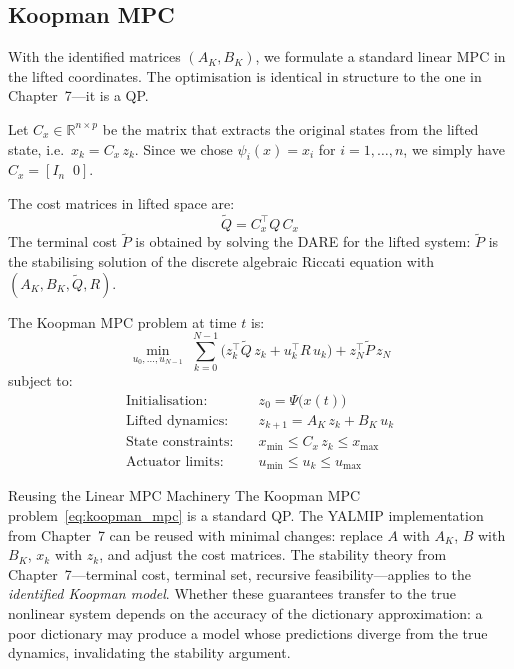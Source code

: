 \subsection{Koopman MPC}
\label{sec:koopman_mpc}

With the identified matrices $(A_K, B_K)$, we formulate a standard linear MPC in the lifted coordinates. The optimisation is identical in structure to the one in Chapter~7---it is a QP.

Let $C_x \in \mathbb{R}^{n \times p}$ be the matrix that extracts the original states from the lifted state, i.e.\ $x_k = C_x\,z_k$. Since we chose $\psi_i(x) = x_i$ for $i = 1, \ldots, n$, we simply have $C_x = [I_n \;\; 0]$.

The cost matrices in lifted space are:
\[
\tilde{Q} = C_x^\top Q\,C_x
\]
The terminal cost $\tilde{P}$ is obtained by solving the DARE for the lifted system: $\tilde{P}$ is the stabilising solution of the discrete algebraic Riccati equation with $(A_K, B_K, \tilde{Q}, R)$.

The Koopman MPC problem at time $t$ is:
\begin{equation}\label{eq:koopman_mpc}
	\min_{u_0, \ldots, u_{N-1}} \; \sum_{k=0}^{N-1}\bigl(z_k^\top \tilde{Q}\,z_k + u_k^\top R\,u_k\bigr) + z_N^\top \tilde{P}\,z_N
\end{equation}
subject to:
\begin{align*}
	\text{Initialisation:} \quad & z_0 = \Psi\bigl(x(t)\bigr) \\
	\text{Lifted dynamics:} \quad & z_{k+1} = A_K\,z_k + B_K\,u_k \\
	\text{State constraints:} \quad & x_{\min} \le C_x\,z_k \le x_{\max} \\
	\text{Actuator limits:} \quad & u_{\min} \le u_k \le u_{\max}
\end{align*}

\begin{notebox}{Reusing the Linear MPC Machinery}
	The Koopman MPC problem~\eqref{eq:koopman_mpc} is a standard QP. The YALMIP implementation from Chapter~7 can be reused with minimal changes: replace $A$ with $A_K$, $B$ with $B_K$, $x_k$ with $z_k$, and adjust the cost matrices. The stability theory from Chapter~7---terminal cost, terminal set, recursive feasibility---applies to the \emph{identified Koopman model}. Whether these guarantees transfer to the true nonlinear system depends on the accuracy of the dictionary approximation: a poor dictionary may produce a model whose predictions diverge from the true dynamics, invalidating the stability argument.
\end{notebox}


